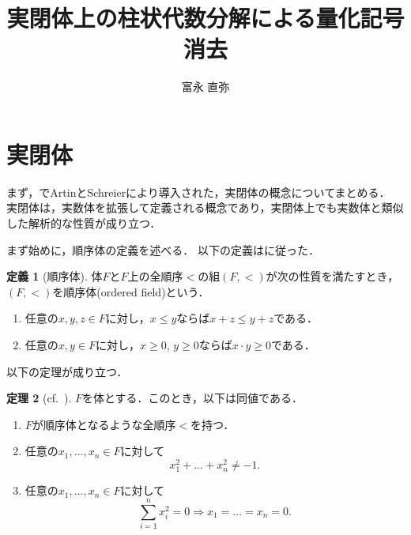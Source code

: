 \documentclass[uplatex, dvipdfmx]{jsarticle}
\numberwithin{equation}{section}
\theoremstyle{definition}
\newtheorem{definition}{定義}[section]
\newtheorem{theorem}[definition]{定理}
\begin{document}
\title{実閉体上の柱状代数分解による量化記号消去}
\author{富永 直弥}
\maketitle


\section{実閉体}

まず，\cite{MR3069467}でArtinとSchreierにより導入された，実閉体の概念についてまとめる．
実閉体は，実数体を拡張して定義される概念であり，実閉体上でも実数体と類似した解析的な性質が成り立つ．

まず始めに，順序体の定義を述べる．
以下の定義は\cite[Definition 1.1.1.]{MR1659509}に従った．

\begin{definition}[順序体]
     体$F$と$F$上の全順序$<$の組$(F,<)$が次の性質を満たすとき，$(F,<)$を順序体(ordered field)という．
     \begin{enumerate}
          \item 任意の$x,y,z\in F$に対し，$x \leq y$ならば$x + z \leq y + z$である．
          \item 任意の$x,y \in F$に対し，$x \geq 0$, $y \geq 0$ならば$x \cdot y \geq 0$である．
     \end{enumerate}
\end{definition}

以下の定理が成り立つ．

\begin{theorem}[{cf.~\cite[Theorem 1.1.8.]{MR1659509}}]\label{theorem:real-field}
     $F$を体とする．このとき，以下は同値である．
     \begin{enumerate}
          \item \label{theorem:real-field-1}
          $F$が順序体となるような全順序$<$を持つ．
          \item \label{theorem:real-field-2}
          任意の$x_1, \dots, x_n \in F$に対して
          \begin{equation}
               x_1^2 + \dots + x_n^2 \neq -1.
          \end{equation}
          \item \label{theorem:real-field-3}
          任意の$x_1, \dots, x_n \in F$に対して
          \begin{equation}
               \sum_{i=1}^n x_i^2 = 0 \Rightarrow x_1 = \dots = x_n = 0.
          \end{equation}
     \end{enumerate}
\end{theorem}
\end{document}
